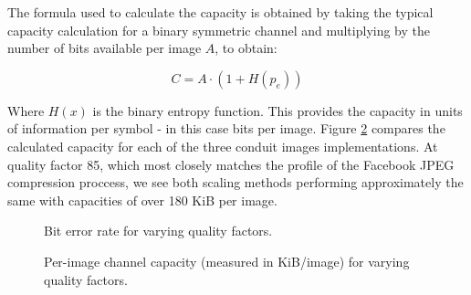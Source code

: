 The formula used to calculate the capacity is obtained by taking the typical capacity calculation for a binary symmetric channel and multiplying by the number of bits available per image $A$, to obtain:

\begin{equation}
    C = A \cdot (1 + H(p_e))
\end{equation}

Where $H(x)$ is the binary entropy function. This provides the capacity in units of information per symbol - in this case bits per image. Figure \ref{graph:capacity} compares the calculated capacity for each of the three conduit images implementations. At quality factor 85, which most closely matches the profile of the Facebook JPEG compression proccess, we see both scaling methods performing approximately the same with capacities of over 180 KiB per image.

\begin{figure}[tbp]
  \begin{center}
    \caption{Bit error rate for varying quality factors.}
    \label{graph:ber}
  \end{center}
\end{figure}

\begin{figure}[tbp]
  \begin{center}
    \caption{Per-image channel capacity (measured in KiB/image) for varying quality factors.}
    \label{graph:capacity}
  \end{center}
\end{figure}

